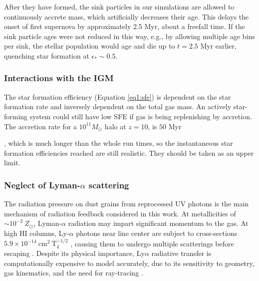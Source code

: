 \documentclass[twocolumn,linenumbers]{aastex631}
\begin{document}
{After they have formed, the sink particles in our simulations are allowed to continuously accrete mass, which artificially decreases their age. This delays the onset of first supernova by approximately 2.5 Myr, about a freefall time. If the sink particle ages were not reduced in this way, e.g., by allowing multiple age bins per sink, the stellar population would age and die up to $t = 2.5$ Myr earlier, quenching star formation at $\epsilon_* \sim 0.5$.

    
\subsubsection{Interactions with the IGM}
The star formation efficiency (Equation \ref{eq1:sfe}) is dependent on the star formation rate and inversely dependent on the total gas mass. An actively star-forming system could still have low SFE if gas is being replenishing by accretion. The accretion rate for a $10^{11} M_\odot$ halo at $z = 10$, is $50$ Myr \citep{2025MNRAS.540.3350A}}, which is much longer than the whole run times, so the instantaneous star formation efficiencies reached are still realistic. They should be taken as an upper limit.



\subsubsection{Neglect of Lyman-$\alpha$ scattering}
The radiation pressure on dust grains from reprocessed UV photons is the main mechanism of radiation feedback considered in this work. At metallicities of $\sim 10^{-2}\ Z_\odot$, Lyman-$\alpha$ radiation may impart significant momentum to the gas. At high HI columns, Ly-$\alpha$ photons near line center are subject to cross-sections $5.9\times 10^{-14}\ \mathrm{cm^2\ T_4^{-1/2}}$ \citep{2024ARA&A..62..529T}, causing them to undergo multiple scatterings before escaping \citep{2008MNRAS.391..457D,2008ApJ...681..771M}. Despite its physical importance, Ly$\alpha$ radiative transfer is computationally expensive to model accurately, due to its sensitivity to geometry, gas kinematics, and the need for ray-tracing \citep{2020MNRAS.497.3925L, 2022ApJ...934...37M}. 
\end{document}
